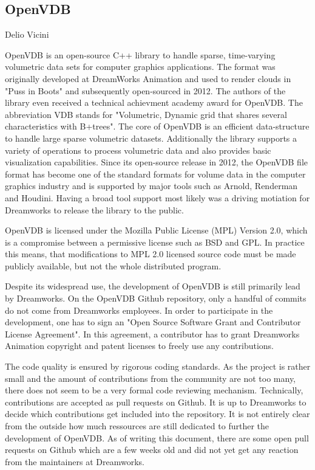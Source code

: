 \subsection{OpenVDB}{Delio Vicini}

OpenVDB is an open-source C++ library to handle sparse, time-varying volumetric data sets for computer graphics applications. The format was originally developed at DreamWorks Animation and used to render clouds in "Puss in Boots" and subsequently open-sourced in 2012.\cite{Museth.2013} The authors of the library even received a technical achievment academy award for OpenVDB.\cite{openvdb-about} The abbreviation VDB stands for "Volumetric, Dynamic grid that
shares several characteristics with B+trees".\cite{Museth.2013} The core of OpenVDB is an efficient data-structure to handle large sparse volumetric datasets. Additionally the library supports a variety of operations to process volumetric data and also provides basic visualization capabilities. Since its open-source release in 2012, the OpenVDB file format has become one of the standard formats for volume data in the computer graphics industry and is supported by major tools such as Arnold, Renderman and Houdini.\cite{openvdb-about} Having a broad tool support most likely was a driving motiation for Dreamworks to release the library to the public.


OpenVDB is licensed under the Mozilla Public License (MPL) Version 2.0, which is a compromise between a permissive license such as BSD and GPL. In practice this means, that modifications to MPL 2.0 licensed source code must be made publicly available, but not the whole distributed program.\cite{mpl-faq}

Despite its widespread use, the development of OpenVDB is still primarily lead by Dreamworks. On the OpenVDB Github repository, only a handful of commits do not come from Dreamworks employees.\cite{openvdb-contribs} In order to participate in the development, one has to sign an "Open Source Software Grant and Contributor License Agreement".\cite{openvdb-agree} In this agreement, a contributor has to grant Dreamworks Animation copyright and patent licenses to freely use any contributions. 


The code quality is ensured by rigorous coding standards.\cite{openvdb-code} As the project is rather small and the amount of contributions from the community are not too many, there does not seem to be a very formal code reviewing mechanism. Technically, contributions are accepted as pull requests on Github. It is up to Dreamworks to decide which contributions get included into the repository. It is not entirely clear from the outside how much ressources are still dedicated to further the development of OpenVDB. As of writing this document, there are some open pull requests on Github which are a few weeks old and did not yet get any reaction from the maintainers at Dreamworks.

